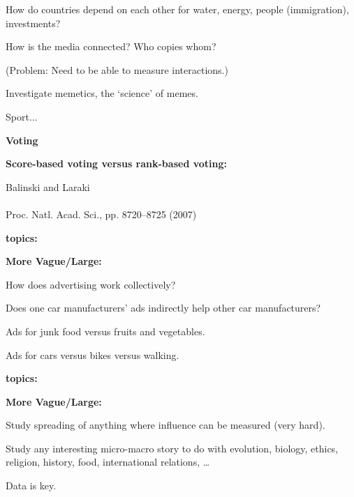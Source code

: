     
      How do countries depend on
      each other for water, energy, people (immigration), investments?
    
      How is the media connected?
      Who copies whom?
    
      (Problem: Need to be able to measure interactions.)
    
      Investigate memetics, the `science' of memes.
     
    
      Sport...
    
  


  \textbf{Voting}
 
  \textbf{Score-based voting versus rank-based voting:}
    
     
      Balinski and Laraki\cite{balinski2007a}\\
      \\
      Proc. Natl. Acad. Sci., pp. 8720--8725 (2007)
    
    
  



  \textbf{topics:}

  \textbf{More Vague/Large:}
    
    
      How does \alert{advertising} work
      collectively?  
     
      Does one car manufacturers' ads
      indirectly help other car manufacturers?
    
      Ads for junk food versus fruits and vegetables.
     
      Ads for cars versus bikes versus walking.
    
  


  \textbf{topics:}

  \textbf{More Vague/Large:}
  
  
    Study spreading of anything
    where influence can be measured (very hard).
  
    Study any interesting micro-macro story to do
    with evolution, biology, ethics, religion, history, food,
    international relations, \ldots
  
    Data is key.
  
  




